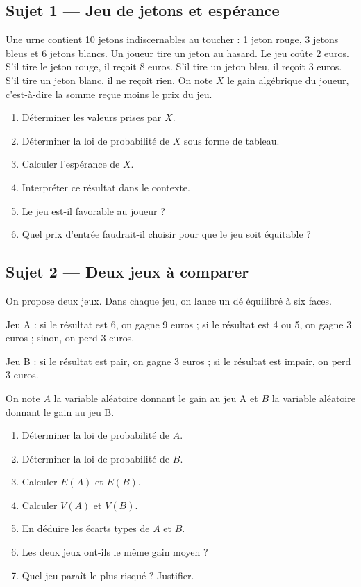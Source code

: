 
\subsection*{Sujet 1 — Jeu de jetons et espérance}

Une urne contient 10 jetons indiscernables au toucher : 1 jeton rouge, 3 jetons bleus et 6 jetons blancs.
Un joueur tire un jeton au hasard. Le jeu coûte 2 euros.
S'il tire le jeton rouge, il reçoit 8 euros. S'il tire un jeton bleu, il reçoit 3 euros. S'il tire un jeton blanc, il ne reçoit rien.
On note $X$ le gain algébrique du joueur, c'est-à-dire la somme reçue moins le prix du jeu.

\begin{enumerate}
\item Déterminer les valeurs prises par $X$.
\item Déterminer la loi de probabilité de $X$ sous forme de tableau.
\item Calculer l'espérance de $X$.
\item Interpréter ce résultat dans le contexte.
\item Le jeu est-il favorable au joueur ?
\item Quel prix d'entrée faudrait-il choisir pour que le jeu soit équitable ?
\end{enumerate}

\subsection*{Sujet 2 — Deux jeux à comparer}

On propose deux jeux. Dans chaque jeu, on lance un dé équilibré à six faces.

Jeu A : si le résultat est 6, on gagne 9 euros ; si le résultat est 4 ou 5, on gagne 3 euros ; sinon, on perd 3 euros.

Jeu B : si le résultat est pair, on gagne 3 euros ; si le résultat est impair, on perd 3 euros.

On note $A$ la variable aléatoire donnant le gain au jeu A et $B$ la variable aléatoire donnant le gain au jeu B.

\begin{enumerate}
\item Déterminer la loi de probabilité de $A$.
\item Déterminer la loi de probabilité de $B$.
\item Calculer $E(A)$ et $E(B)$.
\item Calculer $V(A)$ et $V(B)$.
\item En déduire les écarts types de $A$ et $B$.
\item Les deux jeux ont-ils le même gain moyen ?
\item Quel jeu paraît le plus risqué ? Justifier.
\end{enumerate}

